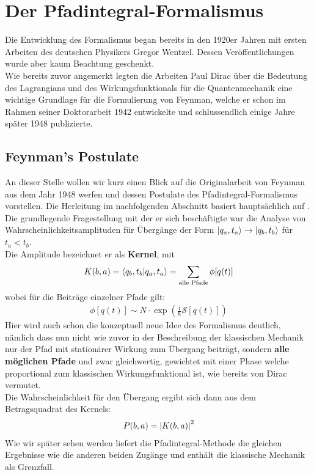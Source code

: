 \section{Der Pfadintegral-Formalismus}
Die Entwicklung des Formalismus began bereits in den 1920er Jahren mit ersten Arbeiten des deutschen Physikers Gregor Wentzel. Dessen Veröffentlichungen wurde aber kaum Beachtung geschenkt. \\
Wie bereits zuvor angemerkt legten die Arbeiten Paul Dirac über die Bedeutung des Lagrangians und des Wirkungsfunktionals für die Quantenmechanik eine wichtige Grundlage für die Formulierung von Feynman, welche er schon im Rahmen seiner Doktorarbeit 1942 entwickelte und schlussendlich einige Jahre später 1948 publizierte. 

\subsection{Feynman's Postulate}
An dieser Stelle wollen wir kurz einen Blick auf die Originalarbeit \cite{Feynman1948} von Feynman aus dem Jahr 1948 werfen und dessen Postulate des Pfadintegral-Formalismus vorstellen. Die Herleitung im nachfolgenden Abschnitt basiert hauptsächlich auf \cite{WeigandQFT2014}. \\
Die grundlegende Fragestellung mit der er sich beschäftigte war  die Analyse von Wahrscheinlichkeitsamplituden für Übergänge der Form $\ket{q_a,t_a}\rightarrow\ket{q_b,t_b}$ für $t_a<t_b$. \\
Die Amplitude bezeichnet er als \textbf{Kernel}, mit
\begin{align}
		K(b,a) = \braket{q_b,t_b}{q_a,t_a} 
			   = \sum_{\text{alle Pfade}}\phi[q(t)]
\end{align}
wobei für die Beiträge einzelner Pfade gilt:
\begin{align}
		\phi[q(t)] \sim N \cdot \exp\left(\frac{\mathrm{i}}{\hbar}\mathcal{S}[q(t)]\right) 
\end{align} 	
Hier wird auch schon die konzeptuell neue Idee des Formalismus deutlich, nämlich dass nun nicht wie zuvor in der Beschreibung der klassischen Mechanik nur der Pfad mit stationärer Wirkung zum Übergang beiträgt, sondern \textbf{alle möglichen Pfade} und zwar gleichwertig, gewichtet mit einer Phase welche proportional zum klassischen Wirkungsfunktional ist, wie bereits von Dirac vermutet. \\
Die Wahrscheinlichkeit für den Übergang ergibt sich dann aus dem Betragsquadrat des Kernels:
\begin{align}
	 P(b,a) = \abs{K(b,a)}^2 
\end{align}
Wie wir später sehen werden liefert die Pfadintegral-Methode die gleichen Ergebnisse wie die anderen beiden Zugänge und enthält die klassische Mechanik als Grenzfall.
